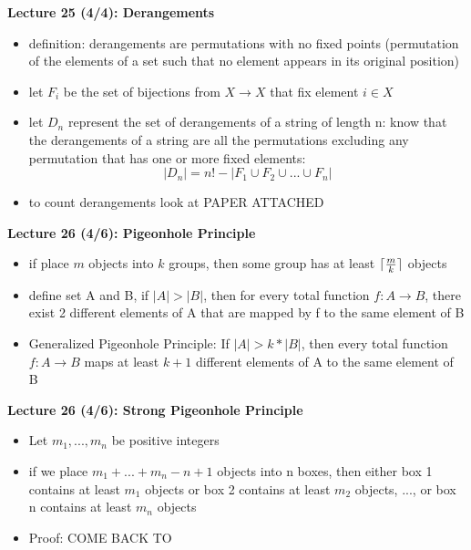 \documentclass[twocolumn]{article}
\DeclarePairedDelimiter{\ceil}{\lceil}{\rceil}
\begin{document}
\textbf{Lecture 25 (4/4): Derangements}
\begin{itemize}
    \item definition: derangements are permutations with no fixed points (permutation of the elements of a set such that no element appears in its original position)
    \item let $F_i$ be the set of bijections from $X \rightarrow X$ that fix element $i \in X$
    \item let $D_n$ represent the set of derangements of a string of length n: know that the derangements of a string are all the permutations excluding any permutation that has one or more fixed elements:
    $$|D_n| = n! - |F_1 \cup F_2 \cup ... \cup F_n|$$
    \item to count derangements look at PAPER ATTACHED
\end{itemize}

\textbf{Lecture 26 (4/6): Pigeonhole Principle}
\begin{itemize}
    \item if place $m$ objects into $k$ groups, then some group has at least %
    $\ceil{\frac{m}{k}}$ objects
    \item define set A and B, if $|A| > |B|$, then for every total function $f: A \rightarrow B$, there exist 2 different elements of A that are mapped by f to the same element of B
    \item Generalized Pigeonhole Principle: If $|A| > k * |B|$, then every total function $f: A \rightarrow B$ maps at least $k+1$ different elements of A to the same element of B
\end{itemize}

\textbf{Lecture 26 (4/6): Strong Pigeonhole Principle}
\begin{itemize}
    \item Let $m_1, ..., m_n$ be positive integers
    \item if we place $m_1 +...+m_n -n +1$ objects into n boxes, then either box 1 contains at least $m_1$ objects or box 2 contains at least $m_2$ objects, ..., or box n contains at least $m_n$ objects
    \item Proof: COME BACK TO
\end{itemize}
\end{document}
